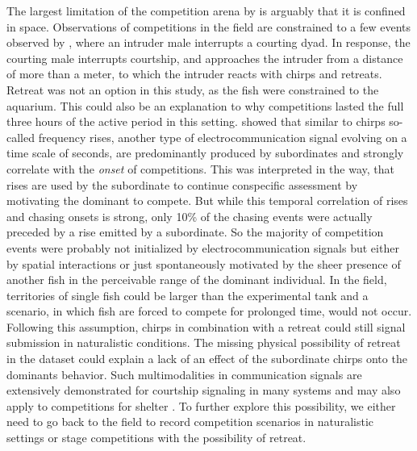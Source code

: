 The largest limitation of the competition arena by
\textcite{raabElectrocommunicationSignalsIndicate2021} is arguably that it is
confined in space. Observations of competitions in the field are constrained to
a few events observed by
\textcite{henningerStatisticsNaturalCommunication2018}, where an intruder male
interrupts a courting dyad. In response, the courting male interrupts
courtship, and approaches the intruder from a distance of more than a meter, to
which the intruder reacts with chirps and retreats. Retreat was not an option
in this study, as the fish were constrained to the aquarium. This could also be
an explanation to why competitions lasted the full three hours of the active
period in this setting. \textcite{raabElectrocommunicationSignalsIndicate2021}
showed that similar to chirps so-called frequency rises, another type of
electrocommunication signal evolving on a time scale of seconds, are
predominantly produced by subordinates and strongly correlate with the
\emph{onset} of competitions. This was interpreted in the way, that rises are
used by the subordinate to continue conspecific assessment by motivating the
dominant to compete. But while this temporal correlation of rises and chasing
onsets is strong, only 10\% of the chasing events were actually preceded by a
rise emitted by a subordinate. So the majority of competition events were
probably not initialized by electrocommunication signals but either by spatial
interactions or just spontaneously motivated by the sheer presence of another
fish in the perceivable range of the dominant individual. In the field,
territories of single fish could be larger than the experimental tank and a
scenario, in which fish are forced to compete for prolonged time, would not
occur. Following this assumption, chirps in combination with a retreat could
still signal submission in naturalistic conditions. The missing physical
possibility of retreat in the dataset could explain a lack of an effect of the
subordinate chirps onto the dominants behavior. Such multimodalities in
communication signals are extensively demonstrated for courtship signaling in
many systems and may also apply to competitions for shelter
\parencite{ronaldMaleMiceAdjust2020,
ronaldWhatMakesMultimodal2017,uetzComplexSignalsComparative2017,
redingContextdependentPreferencesVary2017,
mitoyenEvolutionFunctionMultimodal2019}. To further explore this possibility,
we either need to go back to the field to record competition scenarios in
naturalistic settings or stage competitions with the possibility of retreat.

